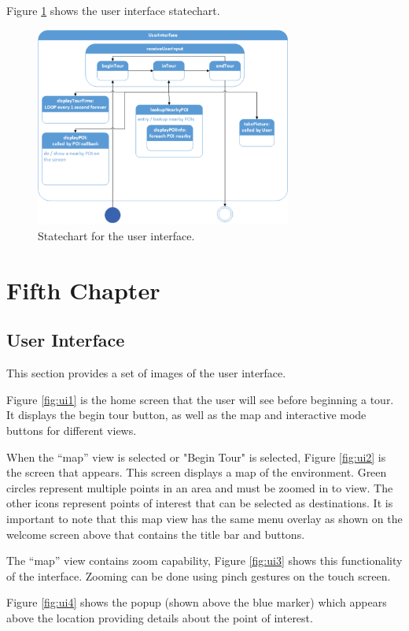 \documentclass[11pt]{report}
\begin{document}
Figure \ref{fig:user_interface_statechart} shows the user interface statechart.
\begin{figure}[H]
 \centering
 \includegraphics[width=0.75\textwidth]{user_interface_statechart.pdf}
 \caption{Statechart for the user interface.}
 \label{fig:user_interface_statechart}
\end{figure}

\chapter{Fifth Chapter}
\label{chap:five}
\section{User Interface}
This section provides a set of images of the user interface.

Figure \ref{fig:ui1} is the home screen that the user will see before beginning a tour. It displays the begin tour button, as well as the map and interactive mode buttons for different views.

When the “map” view is selected or "Begin Tour" is selected, Figure \ref{fig:ui2} is the screen that appears. This screen displays a map of the environment. Green circles represent multiple points in an area and must be zoomed in to view. The other icons represent points of interest that can be selected as destinations. It is important to note that this map view has the same menu overlay as shown on the welcome screen above that contains the title bar and buttons.

The “map” view contains zoom capability, Figure \ref{fig:ui3} shows this functionality of the interface. Zooming can be done using pinch gestures on the touch screen. 

Figure \ref{fig:ui4} shows the popup (shown above the blue marker) which appears above the location providing details about the point of interest.
\end{document}
